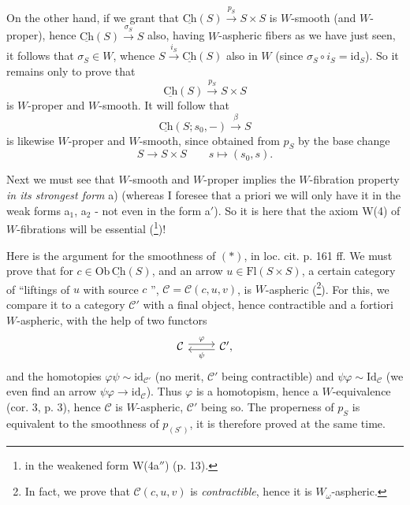 \documentclass[11pt]{article}
\newcommand{\msp}[1]{\marginpar{\footnotesize [#1]}}
\newcommand{\Ch}{\underline{\mathrm{Ch}}}
\begin{document}
On the other hand, if we grant that $\Ch(S) \xrightarrow{p_S} S{\times}S$ is $W$-smooth (and $W$-proper), hence $\Ch(S) \xrightarrow{\sigma_S} S$ also, having $W$-aspheric fibers as we have just seen, it follows that $\sigma_S \in W$, whence $S \xrightarrow{i_S} \Ch(S)$ also in $W$ (since $\sigma_S \circ i_S = \mathrm{id}_S$). So it remains only to prove that
\[ \Ch(S) \xrightarrow{p_S} S \times S \tag*{$(*)$} \]
is $W$-proper and $W$-smooth. It will follow that
\[ \Ch(S; s_0, -) \xrightarrow{\beta} S \]
is likewise $W$-proper and $W$-smooth, since obtained from $p_S$ by the base change
\[ S \longrightarrow S \times S \qquad s \longmapsto (s_0, s). \]

Next we must see that $W$-smooth and $W$-proper implies the $W$-fibration property \textit{in its strongest form} a) (whereas I foresee that a priori we will only have it in the weak forms a$_1$, a$_2$ - not even in the form a$'$). So it is here that the axiom W(4) of $W$-fibrations will be essential (\footnote[15]{in the weakened form W(4a$''$) (p. 13).})!

Here is the argument for the smoothness of $(*)$, in loc. cit. p. 161 ff. We must prove that for $c \in \mathrm{Ob}\,\Ch(S)$, and an arrow $u \in \mathrm{Fl}(S \times S)$, a certain category of ``liftings of $u$ with source $c$ '', $\mathcal{C} = \mathcal{C}(c,u,v)$, is $W$-aspheric (\footnote[16]{In fact, we prove that $\mathcal{C}(c,u,v)$ is \textit{contractible}, hence it is $W_\omega$-aspheric.}). For this, we compare it to a category $\mathcal{C}'$ with a final object, hence contractible and a fortiori $W$-aspheric, with the help of two functors
\[ \begin{tikzcd} \mathcal{C} \arrow[r, shift left, "\varphi"] & \mathcal{C}', \arrow[l, shift left, "\psi"] \end{tikzcd} \]
and the homotopies $\varphi\psi \sim \mathrm{id}_{\mathcal{C}'}$ (no merit, $\mathcal{C}'$ being contractible)
\msp{page 10}
and $\psi\varphi \sim \mathrm{Id}_{\mathcal{C}}$ (we even find an arrow $\psi\varphi \longrightarrow \mathrm{id}_{\mathcal{C}}$). Thus $\varphi$ is a homotopism, hence a $W$-equivalence (cor. 3, p. 3), hence $\mathcal{C}$ is $W$-aspheric, $\mathcal{C}'$ being so. The properness of $p_S$ is equivalent to the smoothness of $p_{(S^\circ)}$, it is therefore proved at the same time.
\end{document}
